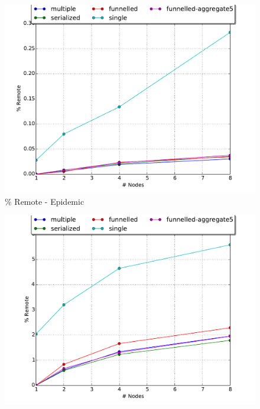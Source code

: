 \documentclass[11pt]{book}
\begin{document}
\begin{figure}
  \begin{minipage}{.5\textwidth}
    \begin{center}
      \includegraphics[width=\textwidth,keepaspectratio,quiet]{figs/partitioning_communication/communication_epidemic_premote.pdf} \\
      \% Remote - Epidemic \\
    \end{center}
  \end{minipage}%
  \hfill
  \begin{minipage}{.5\textwidth}
    \begin{center}
      \includegraphics[width=\textwidth,keepaspectratio,quiet]{figs/partitioning_communication/communication_pcs_premote.pdf} \\

\end{center}
\end{minipage}
\end{figure}
\end{document}
